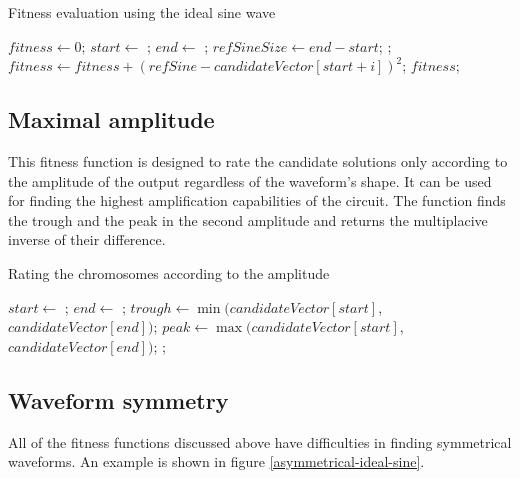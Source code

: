 \begin{algorithm}
\caption{Fitness evaluation using the ideal sine wave}
\label{idealSine}
\begin{algorithmic}[1]
        \State $fitness \gets 0$;
        \State $start \gets$ ;
        \State $end \gets$ ;
        \State $refSineSize \gets end - start$;
           \State {};
           \State $fitness \gets fitness + (refSine - candidateVector[start + i])^2$;
        \EndFor
        \State \Return $fitness$;
    \EndFunction
\end{algorithmic}
\end{algorithm}

\subsection{Maximal amplitude}
This fitness function is designed to rate the candidate solutions only according to the amplitude of the output regardless of the waveform's shape. It can be used for finding the highest amplification capabilities of the circuit. The function finds the trough and the peak in the second amplitude and returns the multiplacive inverse of their difference.

\begin{algorithm}
\caption{Rating the chromosomes according to the amplitude}
\label{maxAmp}
\begin{algorithmic}[1]
        \State $start \gets$ ;
        \State $end \gets$ ;
        \State $trough \gets \min(candidateVector[start]$, $candidateVector[end])$;
        \State $peak \gets \max(candidateVector[start]$, $candidateVector[end])$;
        \State \Return {};
    \EndFunction
\end{algorithmic}
\end{algorithm}

\subsection{Waveform symmetry}
All of the fitness functions discussed above have difficulties in finding symmetrical waveforms. An example is shown in figure \ref{asymmetrical-ideal-sine}.

